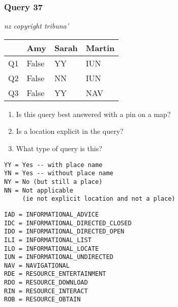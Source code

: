 \begin{frame}[fragile]
\frametitle{Query 37}
\vspace{1em}

\emph{nz copyright tribuna'}

\vfill

\begin{table}
  \centering
  \begin{tabular}{ l l l l }
    & \textbf{Amy} & \textbf{Sarah} & \textbf{Martin}\\
    \toprule
    Q1 & False & YY & IUN\\
Q2 & False & NN & IUN\\
Q3 & False & YY & NAV\\
    \bottomrule
  \end{tabular}
\end{table}

\vfill

\tiny{

\begin{enumerate}
\item Is this query best answered with a pin on a map?
\item Is a location explicit in the query?
\item What type of query is this?
\end{enumerate}

\vfill

\begin{multicols}{2}
\begin{verbatim}
YY = Yes -- with place name
YN = Yes -- without place name
NY = No (but still a place)
NN = Not applicable 
     (ie not explicit location and not a place)
\end{verbatim}

\columnbreak
\begin{verbatim}
IAD = INFORMATIONAL_ADVICE
IDC = INFORMATIONAL_DIRECTED_CLOSED
IDO = INFORMATIONAL_DIRECTED_OPEN
ILI = INFORMATIONAL_LIST
ILO = INFORMATIONAL_LOCATE
IUN = INFORMATIONAL_UNDIRECTED
NAV = NAVIGATIONAL
RDE = RESOURCE_ENTERTAINMENT
RDO = RESOURCE_DOWNLOAD
RIN = RESOURCE_INTERACT
ROB = RESOURCE_OBTAIN
\end{verbatim}
\end{multicols}
}

\end{frame}


